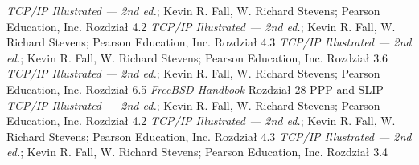 \begin{thebibliography}{99}
    \emph{TCP/IP Illustrated --- 2nd ed.}; Kevin R. Fall, W. Richard Stevens; Pearson Education, Inc.
    Rozdział 4.2
    \emph{TCP/IP Illustrated --- 2nd ed.}; Kevin R. Fall, W. Richard Stevens; Pearson Education, Inc.
    Rozdział 4.3
    \emph{TCP/IP Illustrated --- 2nd ed.}; Kevin R. Fall, W. Richard Stevens; Pearson Education, Inc.
    Rozdział 3.6
    \emph{TCP/IP Illustrated --- 2nd ed.}; Kevin R. Fall, W. Richard Stevens; Pearson Education, Inc.
    Rozdział 6.5
    \emph{FreeBSD Handbook}
    Rozdział 28 PPP and SLIP
    \emph{TCP/IP Illustrated --- 2nd ed.}; Kevin R. Fall, W. Richard Stevens; Pearson Education, Inc.
    Rozdział 4.2
    \emph{TCP/IP Illustrated --- 2nd ed.}; Kevin R. Fall, W. Richard Stevens; Pearson Education, Inc.
    Rozdział 4.3
    \emph{TCP/IP Illustrated --- 2nd ed.}; Kevin R. Fall, W. Richard Stevens; Pearson Education, Inc.
    Rozdział 3.4
\end{thebibliography}
